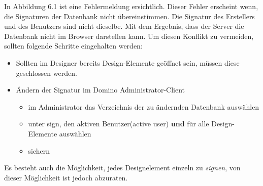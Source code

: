 In Abbildung 6.1 ist eine Fehlermeldung ersichtlich. Dieser Fehler erscheint wenn, die Signaturen der Datenbank nicht übereinstimmen. Die Signatur des
Erstellers und des Benutzers sind nicht dieselbe. Mit dem Ergebnis, dass der Server die Datenbank nicht im Browser darstellen kann. 
\newline
\newline
Um diesen Konflikt zu vermeiden, sollten folgende Schritte eingehalten werden:
\begin{itemize}
\item Sollten im Designer bereits Design-Elemente geöffnet sein, müssen diese geschlossen werden.
\item Ändern der Signatur im Domino Administrator-Client 
\begin{itemize}
\item im Administrator das Verzeichnis der zu ändernden Datenbank auswählen
\item unter sign, den aktiven Benutzer(active user) \textbf{und} für alle Design-Elemente auswählen
\item sichern
\end{itemize}
\end{itemize}
\vspace{0.3cm}
Es besteht auch die Möglichkeit, jedes Designelement einzeln zu \textit{signen}, von dieser Möglichkeit ist jedoch abzuraten. 

